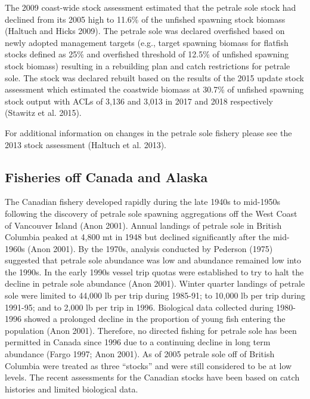 \documentclass[11pt,
  english,
  letterpaper,
]{article}
\begin{document}
The 2009 coast-wide stock assessment estimated that the petrale sole stock had declined from its 2005 high to 11.6\% of the unfished spawning stock biomass (Haltuch and Hicks 2009). The petrale sole was declared overfished based on newly adopted management targets (e.g., target spawning biomass for flatfish stocks defined as 25\% and overfished threshold of 12.5\% of unfished spawning stock biomass) resulting in a rebuilding plan and catch restrictions for petrale sole. The stock was declared rebuilt based on the results of the 2015 update stock assessment which estimated the coastwide biomass at 30.7\% of unfished spawning stock output with ACLs of 3,136 and 3,013 in 2017 and 2018 respectively (Stawitz et al. 2015).

For additional information on changes in the petrale sole fishery please see the 2013 stock assessment (Haltuch et al. 2013).

\hypertarget{fisheries-off-canada-and-alaska}{%
\subsection{Fisheries off Canada and Alaska}\label{fisheries-off-canada-and-alaska}}

The Canadian fishery developed rapidly during the late 1940s to mid-1950s following the discovery of petrale sole spawning aggregations off the West Coast of Vancouver Island (Anon 2001). Annual landings of petrale sole in British Columbia peaked at 4,800 mt in 1948 but declined significantly after the mid-1960s (Anon 2001). By the 1970s, analysis conducted by Pederson (1975) suggested that petrale sole abundance was low and abundance remained low into the 1990s. In the early 1990s vessel trip quotas were established to try to halt the decline in petrale sole abundance (Anon 2001). Winter quarter landings of petrale sole were limited to 44,000 lb per trip during 1985-91; to 10,000 lb per trip during 1991-95; and to 2,000 lb per trip in 1996. Biological data collected during 1980-1996 showed a prolonged decline in the proportion of young fish entering the population (Anon 2001). Therefore, no directed fishing for petrale sole has been permitted in Canada since 1996 due to a continuing decline in long term abundance (Fargo 1997; Anon 2001). As of 2005 petrale sole off of British Columbia were treated as three ``stocks'' and were still considered to be at low levels. The recent assessments for the Canadian stocks have been based on catch histories and limited biological data.
\end{document}
